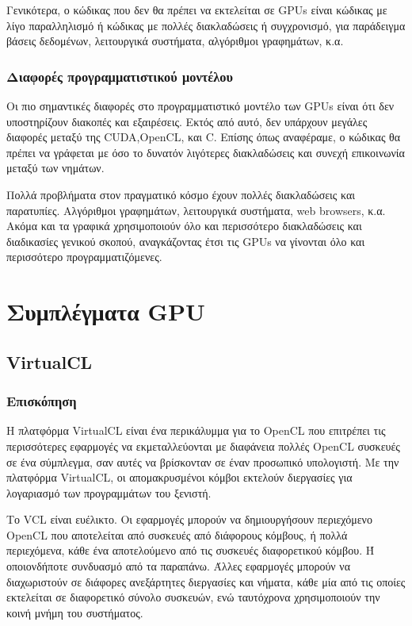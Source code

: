 Γενικότερα, ο κώδικας που δεν θα πρέπει να εκτελείται σε GPUs είναι κώδικας με λίγο παραλληλισμό ή κώδικας με πολλές διακλαδώσεις ή συγχρονισμό, για παράδειγμα βάσεις δεδομένων, λειτουργικά συστήματα, αλγόριθμοι γραφημάτων, κ.α.
\subsubsection{Διαφορές προγραμματιστικού μοντέλου}
Οι πιο σημαντικές διαφορές στο προγραμματιστικό μοντέλο των GPUs είναι ότι δεν υποστηρίζουν διακοπές και εξαιρέσεις. Εκτός από αυτό, δεν υπάρχουν μεγάλες διαφορές μεταξύ της CUDA,OpenCL, και C. Επίσης όπως αναφέραμε, ο κώδικας θα πρέπει να γράφεται με όσο το δυνατόν λιγότερες διακλαδώσεις και συνεχή επικοινωνία μεταξύ των νημάτων.

Πολλά προβλήματα στον πραγματικό κόσμο έχουν πολλές διακλαδώσεις και παρατυπίες. Αλγόριθμοι γραφημάτων, λειτουργικά συστήματα, web browsers, κ.α. Ακόμα και τα γραφικά χρησιμοποιούν όλο και περισσότερο διακλαδώσεις και διαδικασίες γενικού σκοπού, αναγκάζοντας έτσι τις GPUs να γίνονται όλο και περισσότερο προγραμματιζόμενες.

\section{Συμπλέγματα GPU}

\subsection{VirtualCL}
\subsubsection{Επισκόπηση}
Η πλατφόρμα VirtualCL είναι ένα περικάλυμμα για το OpenCL που επιτρέπει τις περισσότερες εφαρμογές να εκμεταλλεύονται με διαφάνεια πολλές OpenCL συσκευές σε ένα σύμπλεγμα, σαν αυτές να βρίσκονταν σε έναν προσωπικό υπολογιστή. Με την πλατφόρμα VirtualCL, οι απομακρυσμένοι κόμβοι εκτελούν διεργασίες για λογαριασμό των προγραμμάτων του ξενιστή.

Το VCL είναι ευέλικτο. Οι εφαρμογές μπορούν να δημιουργήσουν περιεχόμενο OpenCL που αποτελείται από συσκευές από διάφορους κόμβους, ή πολλά περιεχόμενα, κάθε ένα αποτελούμενο από τις συσκευές διαφορετικού κόμβου. Ή οποιονδήποτε συνδυασμό από τα παραπάνω. Άλλες εφαρμογές μπορούν να διαχωριστούν σε διάφορες ανεξάρτητες διεργασίες και νήματα, κάθε μία από τις οποίες εκτελείται σε διαφορετικό σύνολο συσκευών, ενώ ταυτόχρονα χρησιμοποιούν την κοινή μνήμη του συστήματος. 

